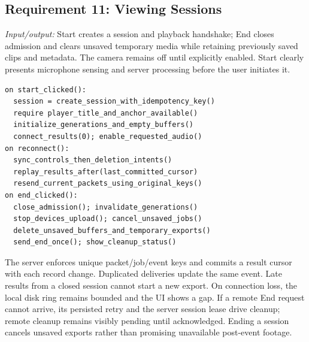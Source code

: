 \subsection{Requirement 11: Viewing Sessions}
\textit{Input/output:} Start creates a session and playback handshake; End closes admission and clears unsaved temporary media while retaining previously saved clips and metadata. The camera remains off until explicitly enabled. Start clearly presents microphone sensing and server processing before the user initiates it.
\par\smallskip\noindent\begin{minipage}{\columnwidth}
\begin{lstlisting}
on start_clicked():
  session = create_session_with_idempotency_key()
  require player_title_and_anchor_available()
  initialize_generations_and_empty_buffers()
  connect_results(0); enable_requested_audio()
on reconnect():
  sync_controls_then_deletion_intents()
  replay_results_after(last_committed_cursor)
  resend_current_packets_using_original_keys()
on end_clicked():
  close_admission(); invalidate_generations()
  stop_devices_upload(); cancel_unsaved_jobs()
  delete_unsaved_buffers_and_temporary_exports()
  send_end_once(); show_cleanup_status()
\end{lstlisting}
\end{minipage}\par
The server enforces unique packet/job/event keys and commits a result cursor with each record change. Duplicated deliveries update the same event. Late results from a closed session cannot start a new export. On connection loss, the local disk ring remains bounded and the UI shows a gap. If a remote End request cannot arrive, its persisted retry and the server session lease drive cleanup; remote cleanup remains visibly pending until acknowledged. Ending a session cancels unsaved exports rather than promising unavailable post-event footage.

